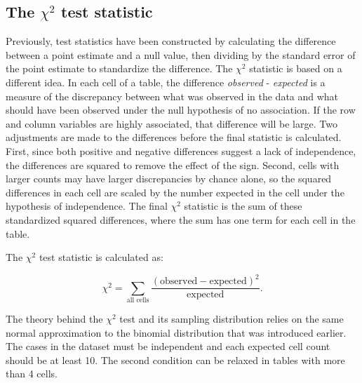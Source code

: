 \subsection{The $\chi^2$ test statistic}

Previously, test statistics have been constructed by calculating the difference between a point estimate and a null value, then dividing by the standard error of the point estimate to standardize the difference. The $\chi^2$ statistic is based on a different idea.  In each cell of a table, the difference \emph{observed} - \emph{expected} is a measure of the discrepancy between what was observed in the data and what should have been observed under the null hypothesis of no association. If the row and column variables are highly associated, that difference will be large.  Two adjustments are made to the differences before the final statistic is calculated.  First, since both positive and negative differences suggest a lack of independence, the differences are squared to remove the effect of the sign.  Second, cells with larger counts may have larger discrepancies by chance alone, so the squared differences in each cell are scaled by the number expected in the cell under the hypothesis of independence.  The final $\chi^2$ statistic is the sum of these standardized squared differences, where the sum has one term for each cell in the table.

The $\chi^2$ test statistic is calculated as:

\[\chi^2 = \sum_{\text{all cells}} \frac{(\text{observed} - \text{expected})^2}{\text{expected}}. \]

The theory behind the $\chi^2$ test and its sampling distribution relies on the same normal approximation to the binomial distribution that was introduced earlier.  The cases in the dataset must be independent and each expected cell count should be at least 10.  The second condition can be relaxed in tables with more than 4 cells.

